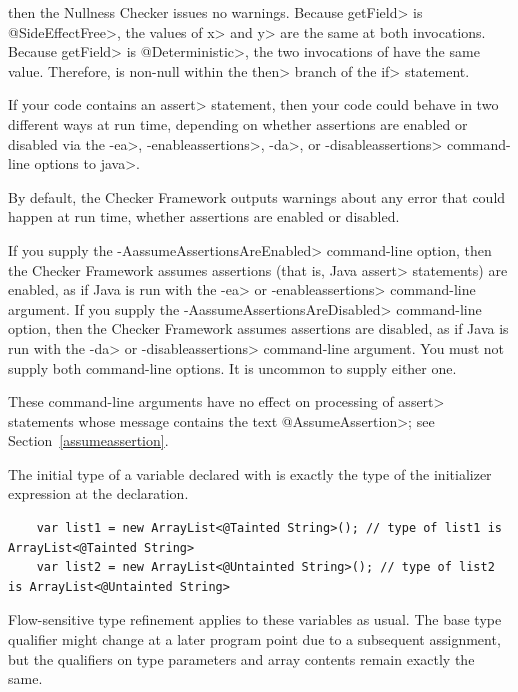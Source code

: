 \noindent
then the Nullness Checker issues no warnings.
Because \<getField> is \<@SideEffectFree>, the values of \<x> and \<y> are the
same at both invocations.
Because \<getField> is \<@Deterministic>, the two invocations of
 have the same value.
Therefore,  is non-null within the \<then> branch
of the \<if> statement.




If your code contains an \<assert> statement, then your code could behave
in two different ways at run time, depending on whether assertions are
enabled or disabled via the \<-ea>, \<-enableassertions>, \<-da>, or
\<-disableassertions> command-line options to \<java>.

By default, the Checker Framework outputs warnings about any error that
could happen at run time, whether assertions are enabled or disabled.

If you supply the \<-AassumeAssertionsAreEnabled> command-line option, then
the Checker Framework assumes assertions (that is, Java \<assert>
statements) are enabled, as if Java is run with the \<-ea> or
\<-enableassertions> command-line argument.  If you supply the
\<-AassumeAssertionsAreDisabled> command-line option, then the Checker
Framework assumes assertions are disabled, as if Java is run with the
\<-da> or \<-disableassertions> command-line argument.  You must not supply
both command-line options.  It is uncommon to supply either one.

These command-line arguments have no effect on processing of \<assert>
statements whose message contains the text \<@AssumeAssertion>; see
Section~\ref{assumeassertion}.



The initial type of a variable declared with  is exactly
the type of the initializer expression at the declaration.

\begin{Verbatim}
    var list1 = new ArrayList<@Tainted String>(); // type of list1 is ArrayList<@Tainted String>
    var list2 = new ArrayList<@Untainted String>(); // type of list2 is ArrayList<@Untainted String>
\end{Verbatim}

Flow-sensitive type refinement applies to these variables as usual.
The base type qualifier might change at a later program point due to
a subsequent assignment, but the qualifiers on type parameters and
array contents remain exactly the same.

